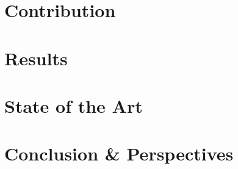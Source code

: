 \documentclass[a4paper]{article}
\begin{document}
\section{Contribution}

\section{Results}

\section{State of the Art}

\cite{kamina_towards_2009}
\cite{adams_enterprise_2013}
\cite{aotani_featherweight_2011}
\cite{appeltauer_declarative_2012}
\cite{appeltauer_dedicated_2008}
\cite{appeltauer_layered_2010}
\cite{bettini_survey_2010}


\section{Conclusion \& Perspectives}

%
%



\end{document}
